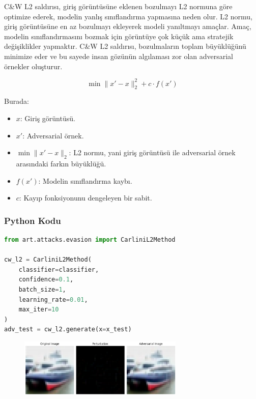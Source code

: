 C\&W L2 saldırısı, giriş görüntüsüne eklenen bozulmayı L2 normuna göre optimize ederek, modelin yanlış sınıflandırma yapmasına neden olur. L2 normu, giriş görüntüsüne en az bozulmayı ekleyerek modeli yanıltmayı amaçlar. Amaç, modelin sınıflandırmasını bozmak için görüntüye çok küçük ama stratejik değişiklikler yapmaktır. C\&W L2 saldırısı, bozulmaların toplam büyüklüğünü minimize eder ve bu sayede insan gözünün algılaması zor olan adversarial örnekler oluşturur.

\[ \min \|x' - x\|_2^2 + c \cdot f(x') \]

Burada:

\begin{itemize}
    \item $x$: Giriş görüntüsü.
    \item $x'$: Adversarial örnek.
    \item $\min \|x' - x\|_2$: L2 normu, yani giriş görüntüsü ile adversarial örnek arasındaki farkın büyüklüğü.
    \item $f(x')$: Modelin sınıflandırma kaybı.
    \item $c$: Kayıp fonksiyonunu dengeleyen bir sabit.
\end{itemize}

\subsubsection{Python Kodu}

\begin{lstlisting}[language=Python]
from art.attacks.evasion import CarliniL2Method

cw_l2 = CarliniL2Method(
    classifier=classifier, 
    confidence=0.1, 
    batch_size=1, 
    learning_rate=0.01, 
    max_iter=10
)
adv_test = cw_l2.generate(x=x_test)
\end{lstlisting}

\begin{figure}[h]
    \centering
    \includegraphics[width=0.7\textwidth]{images/cw_l2_results.png}
    \caption{}
\end{figure}

\newpage

